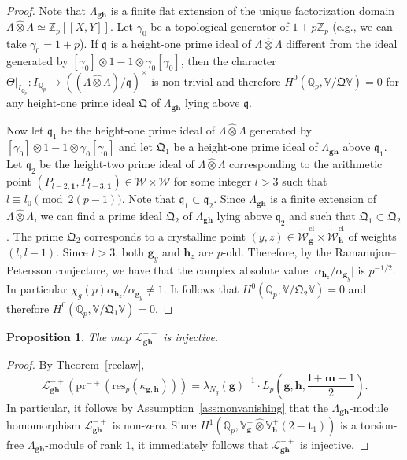 \documentclass[a4paper,11pt]{amsart}
\theoremstyle{plain}
\newtheorem{propo}[theorem]{Proposition}
\theoremstyle{definition}
\theoremstyle{remark}
\newcommand{\bb}{\mathbb}
\newcommand{\frk}{\mathfrak}
\newcommand{\cl}{\mathcal}
\newcommand{\hg}{{\mathbf{g}}}
\newcommand{\hh}{{\mathbf h}}
\newcommand{\res}{\mathrm{res}}
\numberwithin{equation}{section}
\begin{document}
\begin{proof}
    Note that $\Lambda_{\hg\hh}$ is a finite flat extension of the unique factorization domain $\Lambda\hat{\otimes}\Lambda\simeq \bb{Z}_p[[X,Y]]$. Let $\gamma_0$ be a topological generator of $1+p\bb{Z}_p$ (e.g., we can take $\gamma_0=1+p$). If $\frk{q}$ is a height-one prime ideal of $\Lambda\hat{\otimes}\Lambda$ different from the ideal generated by $[\gamma_0]\otimes 1-1\otimes \gamma_0[\gamma_0]$, then the character $\Theta\vert_{I_{\bb{Q}_p}}:I_{\bb{Q}_p}\rightarrow ((\Lambda\hat{\otimes}\Lambda)/\frk{q})^\times$ is non-trivial and therefore $H^0(\bb{Q}_p,\bb{V}/\frk{Q}\bb{V})=0$ for any height-one prime ideal $\frk{Q}$ of $\Lambda_{\hg\hh}$ lying above $\frk{q}$.

    Now let $\frk{q}_1$ be the height-one prime ideal of $\Lambda\hat{\otimes}\Lambda$ generated by $[\gamma_0]\otimes 1-1\otimes \gamma_0[\gamma_0]$ and let $\frk{Q}_1$ be a height-one prime ideal of $\Lambda_{\hg\hh}$ above $\frk{q}_1$. Let $\frk{q}_2$ be the height-two prime ideal of $\Lambda\hat{\otimes}\Lambda$ corresponding to the arithmetic point $(P_{l-2,\bm{1}},P_{l-3,\bm{1}})\in\cl{W}\times\cl{W}$ for some integer $l>3$ such that $l\equiv l_0\pmod{2(p-1)}$. Note that $\frk{q}_1\subset \frk{q}_2$. Since $\Lambda_{\hg\hh}$ is a finite extension of $\Lambda\hat{\otimes}\Lambda$, we can find a prime ideal $\frk{Q}_2$ of $\Lambda_{\hg\hh}$ lying above $\frk{q}_2$ and such that $\frk{Q}_1\subset \frk{Q}_2$. The prime $\frk{Q}_2$ corresponds to a crystalline point $(y,z)\in \tilde{\cl{W}}_{\hg}^{\mathrm{cl}}\times \tilde{\cl{W}}_{\hh}^{\mathrm{cl}}$ of weights $(l,l-1)$. Since $l>3$, both $\hg_y$ and $\hh_z$ are $p$-old. Therefore, by the Ramanujan--Petersson conjecture, we have that the complex absolute value $\vert \alpha_{\hh_z}/\alpha_{\hg_y}\vert$ is $p^{-1/2}$. In particular $\chi_g(p)\alpha_{\hh_z}/\alpha_{\hg_y}\neq 1$. It follows that $H^0(\bb{Q}_p,\bb{V}/\frk{Q}_2\bb{V})=0$ and therefore $H^0(\bb{Q}_p,\bb{V}/\frk{Q}_1\bb{V})=0$.
\end{proof}


\begin{propo}\label{prop:injectivityofPR}
    The map $\cl{L}_{\hg\hh}^{-+}$ is injective.
\end{propo}
\begin{proof}
    By Theorem~\ref{reclaw},
    \[
    \cl{L}_{\hg\hh}^{-+}(\mathrm{pr}^{-+}(\res_p(\kappa_{\hg,\hh})))=\lambda_{N_g}(\hg)^{-1}\cdot L_p\left(\hg,\hh,\frac{\mathbf{l}+\mathbf{m}-1}{2}\right).
    \]
    In particular, it follows by Assumption~\ref{ass:nonvanishing} that the $\Lambda_{\hg\hh}$-module homomorphism $\cl{L}_{\hg\hh}^{-+}$ is non-zero. Since $H^1(\bb{Q}_p,\bb{V}_{\hg}^{-}\hat{\otimes}\bb{V}_{\hh}^+(2-\mathbf{t}_1))$ is a torsion-free $\Lambda_{\hg\hh}$-module of rank $1$, it immediately follows that $\cl{L}_{\hg\hh}^{-+}$ is injective.
\end{proof}
\end{document}
